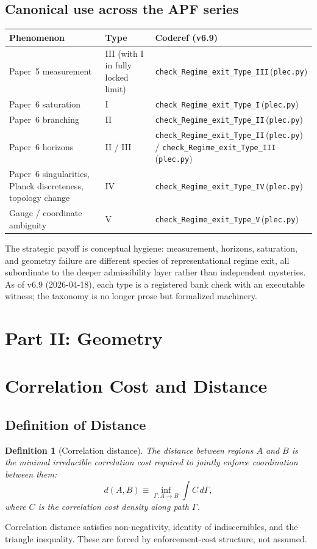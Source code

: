 \documentclass[11pt]{article}
\newtheorem{definition}[theorem]{Definition}
\newcommand{\coderef}[2]{\texttt{#1}\,(\texttt{#2})}
\begin{document}
\subsection{Canonical use across the APF series}
\begin{center}
\begin{tabular}{@{}lll@{}}
\toprule
Phenomenon & Type & Coderef (v6.9) \\
\midrule
Paper~5 measurement & III (with I in fully locked limit) & \coderef{check\_Regime\_exit\_Type\_III}{plec.py} \\
Paper~6 saturation & I & \coderef{check\_Regime\_exit\_Type\_I}{plec.py} \\
Paper~6 branching & II & \coderef{check\_Regime\_exit\_Type\_II}{plec.py} \\
Paper~6 horizons & II / III & \coderef{check\_Regime\_exit\_Type\_II}{plec.py} / \coderef{check\_Regime\_exit\_Type\_III}{plec.py} \\
Paper~6 singularities, Planck discreteness, topology change & IV & \coderef{check\_Regime\_exit\_Type\_IV}{plec.py} \\
Gauge / coordinate ambiguity & V & \coderef{check\_Regime\_exit\_Type\_V}{plec.py} \\
\bottomrule
\end{tabular}
\end{center}
The strategic payoff is conceptual hygiene: measurement, horizons, saturation,
and geometry failure are different species of representational regime exit, all
subordinate to the deeper admissibility layer rather than independent mysteries.
As of v6.9 (2026-04-18), each type is a registered bank check with an
executable witness; the taxonomy is no longer prose but formalized
machinery.

\section*{Part II: Geometry}

\section{Correlation Cost and Distance}

\subsection{Definition of Distance}
\begin{definition}[Correlation distance]
The distance between regions $A$ and $B$ is the minimal irreducible correlation
cost required to jointly enforce coordination between them:
\[
d(A,B) \equiv \inf_{\Gamma : A \to B} \int C\,d\Gamma,
\]
where $C$ is the correlation cost density along path $\Gamma$.
\end{definition}
Correlation distance satisfies non-negativity, identity of indiscernibles, and
the triangle inequality. These are forced by enforcement-cost structure, not
assumed.
\end{document}
